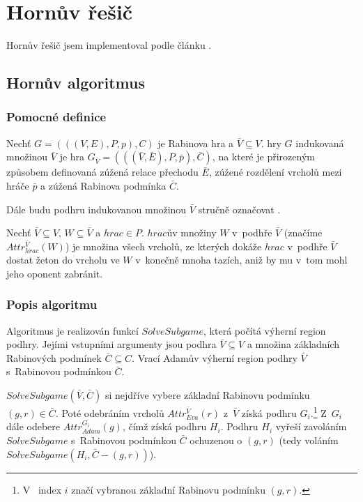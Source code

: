 \chapter{Hornův řešič} \label{chap:horn}
Hornův řešič jsem implementoval podle článku \cite{Horn2005}.
\section{Hornův algoritmus}
\subsection{Pomocné definice}
\begin{definition}
Nechť $G = (((V, E), P, p), C)$ je Rabinova hra a $\bar{V} \subseteq V$.  hry $G$ indukovaná množinou $\bar{V}$ je hra $G_{\bar{V}} = (((\bar{V}, \bar{E}), P, \bar{p}), \bar{C})$, na které je přirozeným způsobem definovaná zúžená relace přechodu $\bar{E}$, zúžené rozdělení vrcholů mezi hráče $\bar{p}$ a zúžená Rabinova podmínka $\bar{C}$.
\end{definition}
Dále budu podhru indukovanou množinou $\bar{V}$ stručně označovat .
\begin{definition}
\label{def:atraktor}
Nechť $\bar{V} \subseteq V$, $W \subseteq \bar{V}$ a $hrac \in P$. $hrac$ův  množiny $W$ v~podhře $\bar{V}$ (značíme $Attr^{\bar{V}}_{hrac}(W)$) je množina všech vrcholů, ze kterých dokáže $hrac$ v~podhře $\bar{V}$ dostat žeton do vrcholu ve $W$ v~konečně mnoha tazích, aniž by mu v~tom mohl jeho oponent zabránit.
\end{definition}
\subsection{Popis algoritmu}
Algoritmus je realizován funkcí $SolveSubgame$, která počítá výherní region podhry. Jejími vstupními argumenty jsou podhra $\bar{V} \subseteq V$ a množina základních Rabinových podmínek $\bar{C} \subseteq C$. Vrací Adamův výherní region podhry $\bar{V}$ s~Rabinovou podmínkou $\bar{C}$.

$SolveSubgame(\bar{V}, \bar{C})$ si nejdříve vybere základní Rabinovu podmínku $(g, r) \in \bar{C}$. Poté odebráním vrcholů $Attr^{\bar{V}}_{Eva}(r)$ z~$\bar{V}$ získá podhru $G_i$.\footnote{V~\cite{Horn2005} index $i$ značí vybranou základní Rabinovu podmínku $(g, r)$.} Z~$G_i$ dále odebere $Attr^{G_i}_{Adam}(g)$, čímž získá podhru $H_i$. Podhru $H_i$ vyřeší zavoláním $SolveSubgame$ s~Rabinovou podmínkou $\bar{C}$ ochuzenou o $(g, r)$ (tedy voláním $SolveSubgame(H_i, \bar{C} - (g, r))$).

